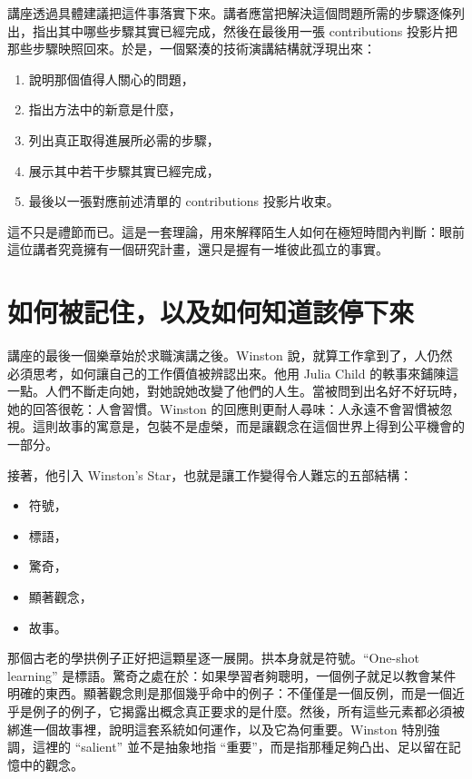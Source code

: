 講座透過具體建議把這件事落實下來。講者應當把解決這個問題所需的步驟逐條列出，指出其中哪些步驟其實已經完成，然後在最後用一張 contributions 投影片把那些步驟映照回來。於是，一個緊湊的技術演講結構就浮現出來：

\begin{enumerate}
\item 說明那個值得人關心的問題，
\item 指出方法中的新意是什麼，
\item 列出真正取得進展所必需的步驟，
\item 展示其中若干步驟其實已經完成，
\item 最後以一張對應前述清單的 contributions 投影片收束。
\end{enumerate}

這不只是禮節而已。這是一套理論，用來解釋陌生人如何在極短時間內判斷：眼前這位講者究竟擁有一個研究計畫，還只是握有一堆彼此孤立的事實。

\section{如何被記住，以及如何知道該停下來}

講座的最後一個樂章始於求職演講之後。Winston 說，就算工作拿到了，人仍然必須思考，如何讓自己的工作價值被辨認出來。他用 Julia Child 的軼事來鋪陳這一點。人們不斷走向她，對她說她改變了他們的人生。當被問到出名好不好玩時，她的回答很乾：人會習慣。Winston 的回應則更耐人尋味：人永遠不會習慣被忽視。這則故事的寓意是，包裝不是虛榮，而是讓觀念在這個世界上得到公平機會的一部分。

接著，他引入 Winston's Star，也就是讓工作變得令人難忘的五部結構：

\begin{itemize}
\item 符號，
\item 標語，
\item 驚奇，
\item 顯著觀念，
\item 故事。
\end{itemize}

那個古老的學拱例子正好把這顆星逐一展開。拱本身就是符號。``One-shot learning'' 是標語。驚奇之處在於：如果學習者夠聰明，一個例子就足以教會某件明確的東西。顯著觀念則是那個幾乎命中的例子：不僅僅是一個反例，而是一個近乎是例子的例子，它揭露出概念真正要求的是什麼。然後，所有這些元素都必須被綁進一個故事裡，說明這套系統如何運作，以及它為何重要。Winston 特別強調，這裡的 ``salient'' 並不是抽象地指 ``重要''，而是指那種足夠凸出、足以留在記憶中的觀念。

